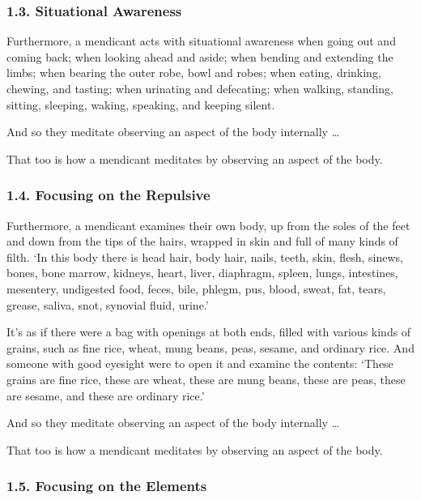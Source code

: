 \documentclass[12pt,openany]{book}%
\begin{document}
\subsubsection*{1.3. Situational Awareness }

Furthermore, a mendicant acts with situational awareness when going out and coming back; when looking ahead and aside; when bending and extending the limbs; when bearing the outer robe, bowl and robes; when eating, drinking, chewing, and tasting; when urinating and defecating; when walking, standing, sitting, sleeping, waking, speaking, and keeping silent. 

And so they meditate observing an aspect of the body internally … 

That too is how a mendicant meditates by observing an aspect of the body. 

\subsubsection*{1.4. Focusing on the Repulsive }

Furthermore, a mendicant examines their own body, up from the soles of the feet and down from the tips of the hairs, wrapped in skin and full of many kinds of filth. ‘In this body there is head hair, body hair, nails, teeth, skin, flesh, sinews, bones, bone marrow, kidneys, heart, liver, diaphragm, spleen, lungs, intestines, mesentery, undigested food, feces, bile, phlegm, pus, blood, sweat, fat, tears, grease, saliva, snot, synovial fluid, urine.’ 

It’s as if there were a bag with openings at both ends, filled with various kinds of grains, such as fine rice, wheat, mung beans, peas, sesame, and ordinary rice. And someone with good eyesight were to open it and examine the contents: ‘These grains are fine rice, these are wheat, these are mung beans, these are peas, these are sesame, and these are ordinary rice.’ 

And so they meditate observing an aspect of the body internally … 

That too is how a mendicant meditates by observing an aspect of the body. 

\subsubsection*{1.5. Focusing on the Elements }
\end{document}
